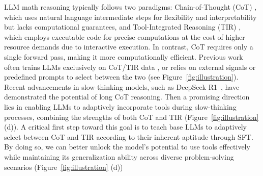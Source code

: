 LLM math reasoning typically follows two paradigms: Chain-of-Thought (CoT) \citep{CoT2022Wei}, which uses natural language intermediate steps for flexibility and interpretability but lacks computational guarantees, and Tool-Integrated Reasoning (TIR) \citep{PoT2022Chen, PAL2023gao}, which employs executable code for precise computations at the cost of higher resource demands due to interactive execution. In contrast, CoT requires only a single forward pass, making it more computationally efficient.
Previous work often trains LLMs exclusively on CoT/TIR data \citep{dartmath2024tong, deepseekmath2024shao, yan2024s, tora2023Gou, mathcoder2023wang, mathcoder22024lu}, or relies on external signals or predefined prompts to select between the two \citep{automatictoolselect2023zhao, mammoth2023yue, Qwen25Math2024Yang} (see Figure~\ref{fig:illustration}).
Recent advancements in slow-thinking models, such as DeepSeek R1~\citep{deepseekr12025deepseekai}, have demonstrated the potential of long CoT reasoning.
Then a promising direction lies in enabling LLMs to adaptively incorporate tools during slow-thinking processes, combining the strengths of both CoT and TIR (Figure~\ref{fig:illustration} (d)).
A critical first step toward this goal is to teach base LLMs to adaptively select between CoT and TIR according to their inherent aptitude through SFT.
By doing so, we can better unlock the model's potential to use tools effectively while maintaining its generalization ability across diverse problem-solving scenarios (Figure~\ref{fig:illustration} (d))

